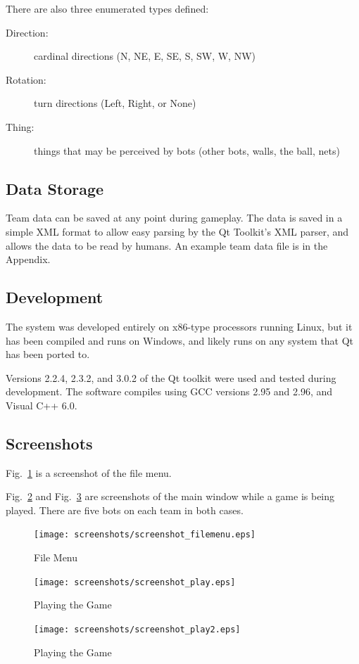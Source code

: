 \documentclass[%
        compressed,
        notitlepage,
        narroweqnarray,
        inline,
        ]{ieee}
\begin{document}
There are also three enumerated types defined: 
\nopagebreak
\begin{description}
\item [Direction:] cardinal directions (N, NE, E, SE, S, SW, W, NW) 
\item [Rotation:] turn directions (Left, Right, or None) 
\item [Thing:] things that may be perceived by bots (other bots, walls, the ball, nets)
\end{description}

\subsection{Data Storage}

Team data can be saved at any point during gameplay. The data is saved in a
simple XML format to allow easy parsing by the Qt Toolkit's XML parser, and
allows the data to be read by humans. An example team data file is in the
Appendix.

\subsection{Development}

The system was developed entirely on x86-type processors running Linux, but
it has been compiled and runs on Windows, and likely runs on any system that Qt has
been ported to.

Versions 2.2.4, 2.3.2, and 3.0.2 of the Qt toolkit were used and tested during development.
The software compiles using GCC versions 2.95 and 2.96, and Visual C++ 6.0.

\subsection{Screenshots}

Fig.~\ref{fig:filemenu} is a screenshot of the file menu.

Fig.~\ref{fig:gameplay} and Fig.~\ref{fig:game2} are screenshots of the main
window while a game is being played. There are five bots on each team in
both cases.

\begin{figure}[htp]
\centering
\texttt{[image: screenshots/screenshot\_filemenu.eps]}
\caption[File Menu]{File Menu}
\label{fig:filemenu}
\end{figure}
\begin{figure}[htp]
\centering
\texttt{[image: screenshots/screenshot\_play.eps]}
\caption[Gameplay 1]{Playing the Game}
\label{fig:gameplay}
\end{figure}
\begin{figure}[htp]
\centering
\texttt{[image: screenshots/screenshot\_play2.eps]}
\caption[Gameplay 2]{Playing the Game}
\label{fig:game2}
\end{figure}
\end{document}
